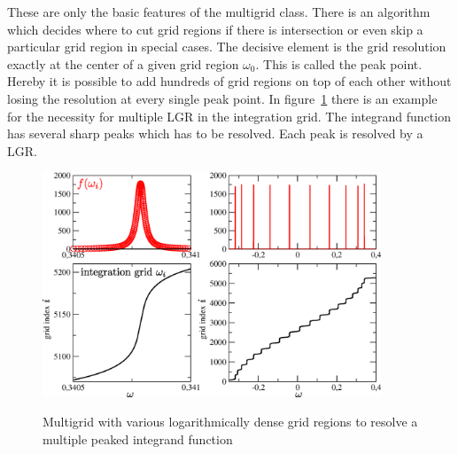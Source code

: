 \documentclass[a4paper]{scrreprt}
\begin{document}
These are only the basic features of the multigrid class. There is an algorithm which decides where to cut grid regions if there is intersection or even skip a particular grid region in special cases. The decisive element is the grid resolution exactly at the center of a given grid region $\omega_0$. This is called the peak point. Hereby it is possible to add hundreds of grid regions on top of each other without losing the resolution at every single peak point. In figure~\ref{fig:multiple_lgr} there is an example for the necessity for multiple LGR in the integration grid. The integrand function has several sharp peaks which has to be resolved. Each peak is resolved by a LGR.
\begin{figure}[h]
	\centering
	\includegraphics[width=0.9\textwidth]{pics/multiple_loggridregions.eps}
	\label{fig:multiple_lgr}
	\caption{Multigrid with various logarithmically dense grid regions to resolve a multiple peaked integrand function}
\end{figure}
\end{document}
